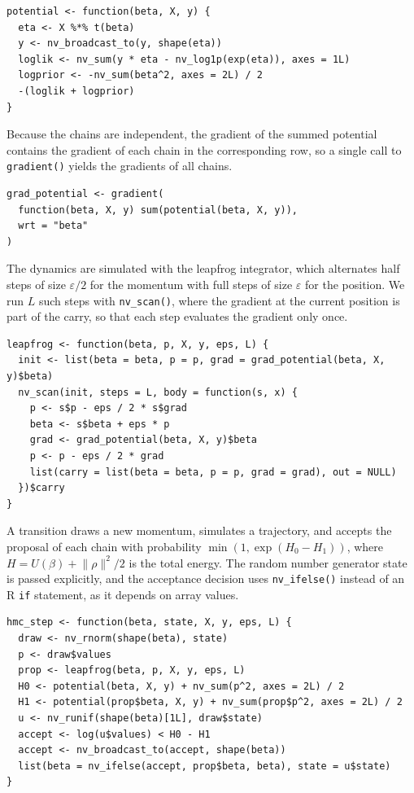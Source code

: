 \begin{verbatim}
potential <- function(beta, X, y) {
  eta <- X %*% t(beta)
  y <- nv_broadcast_to(y, shape(eta))
  loglik <- nv_sum(y * eta - nv_log1p(exp(eta)), axes = 1L)
  logprior <- -nv_sum(beta^2, axes = 2L) / 2
  -(loglik + logprior)
}
\end{verbatim}

Because the chains are independent, the gradient of the summed potential contains the gradient of each chain in the corresponding row, so a single call to \texttt{gradient()} yields the gradients of all chains.

\begin{verbatim}
grad_potential <- gradient(
  function(beta, X, y) sum(potential(beta, X, y)),
  wrt = "beta"
)
\end{verbatim}

The dynamics are simulated with the leapfrog integrator, which alternates half steps of size \(\varepsilon/2\) for the momentum with full steps of size \(\varepsilon\) for the position.
We run \(L\) such steps with \texttt{nv\_scan()}, where the gradient at the current position is part of the carry, so that each step evaluates the gradient only once.

\begin{verbatim}
leapfrog <- function(beta, p, X, y, eps, L) {
  init <- list(beta = beta, p = p, grad = grad_potential(beta, X, y)$beta)
  nv_scan(init, steps = L, body = function(s, x) {
    p <- s$p - eps / 2 * s$grad
    beta <- s$beta + eps * p
    grad <- grad_potential(beta, X, y)$beta
    p <- p - eps / 2 * grad
    list(carry = list(beta = beta, p = p, grad = grad), out = NULL)
  })$carry
}
\end{verbatim}

A transition draws a new momentum, simulates a trajectory, and accepts the proposal of each chain with probability \(\min(1, \exp(H_0 - H_1))\), where \(H = U(\beta) + \lVert \rho \rVert^2 / 2\) is the total energy.
The random number generator state is passed explicitly, and the acceptance decision uses \texttt{nv\_ifelse()} instead of an R \texttt{if} statement, as it depends on array values.

\begin{verbatim}
hmc_step <- function(beta, state, X, y, eps, L) {
  draw <- nv_rnorm(shape(beta), state)
  p <- draw$values
  prop <- leapfrog(beta, p, X, y, eps, L)
  H0 <- potential(beta, X, y) + nv_sum(p^2, axes = 2L) / 2
  H1 <- potential(prop$beta, X, y) + nv_sum(prop$p^2, axes = 2L) / 2
  u <- nv_runif(shape(beta)[1L], draw$state)
  accept <- log(u$values) < H0 - H1
  accept <- nv_broadcast_to(accept, shape(beta))
  list(beta = nv_ifelse(accept, prop$beta, beta), state = u$state)
}
\end{verbatim}

